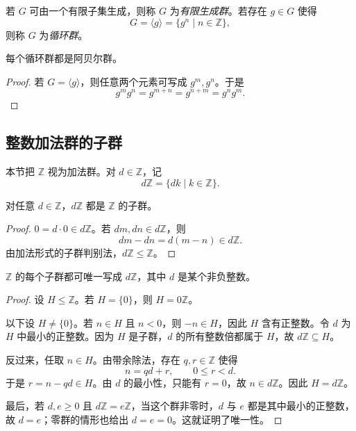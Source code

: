 若 $G$ 可由一个有限子集生成，则称 $G$ 为\emph{有限生成群}。若存在 $g\in G$ 使得
\[
  G=\langle g\rangle=\{g^n\mid n\in\mathbb Z\},
\]
则称 $G$ 为\emph{循环群}。

\begin{proposition}
每个循环群都是阿贝尔群。
\end{proposition}

\begin{proof}
若 $G=\langle g\rangle$，则任意两个元素可写成 $g^m,g^n$。于是
\[
  g^m g^n=g^{m+n}=g^{n+m}=g^n g^m.
\]
\end{proof}

\subsection{整数加法群的子群}

本节把 $\mathbb Z$ 视为加法群。对 $d\in\mathbb Z$，记
\[
  d\mathbb Z=\{dk\mid k\in\mathbb Z\}.
\]

\begin{proposition}
对任意 $d\in\mathbb Z$，$d\mathbb Z$ 都是 $\mathbb Z$ 的子群。
\end{proposition}

\begin{proof}
$0=d\cdot 0\in d\mathbb Z$。若 $dm,dn\in d\mathbb Z$，则
\[
  dm-dn=d(m-n)\in d\mathbb Z.
\]
由加法形式的子群判别法，$d\mathbb Z\leq\mathbb Z$。
\end{proof}

\begin{theorem}
$\mathbb Z$ 的每个子群都可唯一写成 $d\mathbb Z$，其中 $d$ 是某个非负整数。
\end{theorem}

\begin{proof}
设 $H\leq\mathbb Z$。若 $H=\{0\}$，则 $H=0\mathbb Z$。

以下设 $H\neq\{0\}$。若 $n\in H$ 且 $n<0$，则 $-n\in H$，因此 $H$ 含有正整数。令 $d$ 为 $H$ 中最小的正整数。因为 $H$ 是子群，$d$ 的所有整数倍都属于 $H$，故 $d\mathbb Z\subseteq H$。

反过来，任取 $n\in H$。由带余除法，存在 $q,r\in\mathbb Z$ 使得
\[
  n=qd+r,\qquad 0\leq r<d.
\]
于是 $r=n-qd\in H$。由 $d$ 的最小性，只能有 $r=0$，故 $n\in d\mathbb Z$。因此 $H=d\mathbb Z$。

最后，若 $d,e\geq 0$ 且 $d\mathbb Z=e\mathbb Z$，当这个群非零时，$d$ 与 $e$ 都是其中最小的正整数，故 $d=e$；零群的情形也给出 $d=e=0$。这就证明了唯一性。
\end{proof}
